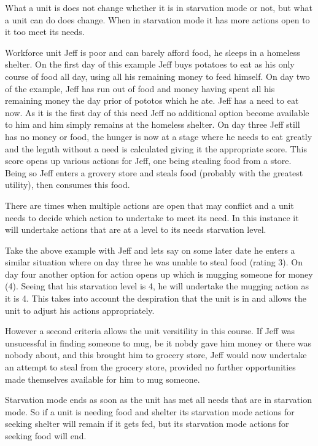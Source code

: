 What a unit is does not change whether it is in starvation mode or not, but what a unit can do does change. When in starvation mode it has more actions open to it too meet its needs.

Workforce unit Jeff is poor and can barely afford food, he sleeps in a homeless shelter. On the first day of this example Jeff buys potatoes to eat as his only course of food all day, using all his remaining money to feed himself. On day two of the example, Jeff has run out of food and money having spent all his remaining money the day prior of pototos which he ate. Jeff has a need to eat now. As it is the first day of this need Jeff no additional option become available to him and him simply remains at the homeless shelter. On day three Jeff still has no money or food, the hunger is now at a stage where he needs to eat greatly and the legnth without a need is calculated giving it the appropriate score. This score opens up various actions for Jeff, one being stealing food from a store. Being so Jeff enters a grovery store and steals food (probably with the greatest utility), then consumes this food.

There are times when multiple actions are open that may conflict and a unit needs to decide which action to undertake to meet its need. In this instance it will undertake actions that are at a level to its needs starvation level.

Take the above example with Jeff and lets say on some later date he enters a similar situation where on day three he was unable to steal food (rating 3). On day four another option for action opens up which is mugging someone for money (4). Seeing that his starvation level is 4, he will undertake the mugging action as it is 4. This takes into account the despiration that the unit is in and allows the unit to adjust his actions appropriately.

However a second criteria allows the unit versitility in this course. If Jeff was unsucessful in finding someone to mug, be it nobdy gave him money or there was nobody about, and this brought him to grocery store, Jeff would now undertake an attempt to steal from the grocery store, provided no further opportunities made themselves available for him to mug someone.


Starvation mode ends as soon as the unit has met all needs that are in starvation mode. So if a unit is needing food and shelter its starvation mode actions for seeking shelter will remain if it gets fed, but its starvation mode actions for seeking food will end. 

